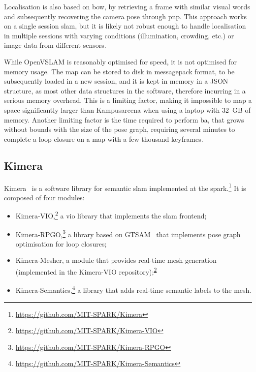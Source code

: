 \documentclass[11pt, letterpaper, twoside]{article}
\begin{document}
Localisation is also based on \gls{bow}, by retrieving a frame with similar
visual words and subsequently recovering the camera pose through \gls{pnp}.
This approach works on a single session \gls{slam}, but it is likely not robust
enough to handle localisation in multiple sessions with varying conditions
(illumination, crowding, etc.) or image data from different sensors.

While OpenVSLAM is reasonably optimised for speed, it is not optimised for
memory usage. The map can be stored to disk in messagepack format, to be
subsequently loaded in a new session, and it is kept in memory in a JSON
structure, as most other data structures in the software, therefore incurring
in a serious memory overhead. This is a limiting factor, making it impossible
to map a space significantly larger than Kampusareena when using a laptop with
32~GB of memory. Another limiting factor is the time required to perform
\gls{ba}, that grows without bounds with the size of the pose graph, requiring
several minutes to complete a loop closure on a map with a few thousand
keyframes.

\subsection{Kimera}

Kimera~\cite{rosinol2019kimera} is a software library for semantic \gls{slam}
implemented at the
\gls{spark}.\footnote{\url{https://github.com/MIT-SPARK/Kimera}} It is composed
of four modules:
\begin{itemize}
    \item
        Kimera-VIO,\footnote{\label{note:kimera_vio}\url{https://github.com/MIT-SPARK/Kimera-VIO}} a
        \gls{vio} library that implements the \gls{slam} frontend;
    \item
        Kimera-RPGO,\footnote{\url{https://github.com/MIT-SPARK/Kimera-RPGO}}
        a library based on GTSAM~\cite{dellaert2006square,dellaert2012factor}
        that implements pose graph optimisation for loop closures;
    \item
        Kimera-Mesher, a module that provides real-time mesh generation
        (implemented in the Kimera-VIO
        repository);\textsuperscript{\ref{note:kimera_vio}}
    \item
        Kimera-Semantics,\footnote{\url{https://github.com/MIT-SPARK/Kimera-Semantics}}
        a library that adds real-time semantic labels to the mesh.
\end{itemize}
\end{document}
